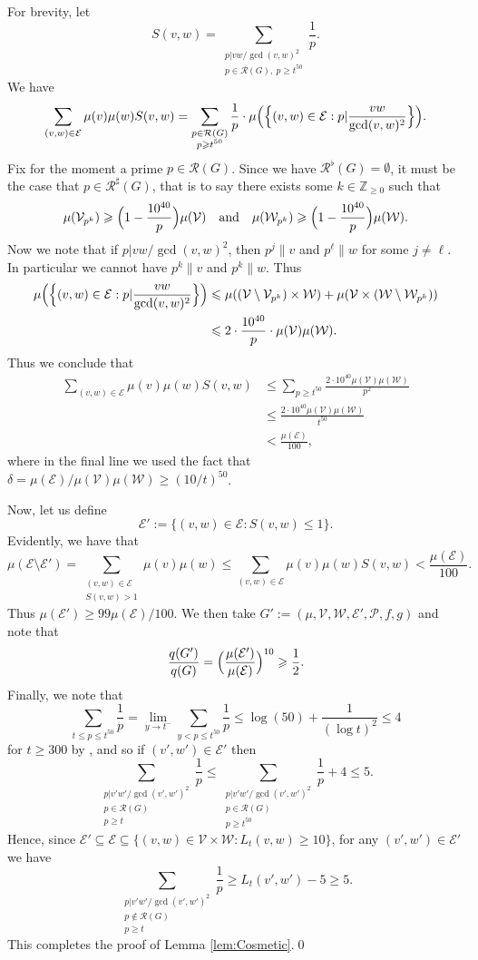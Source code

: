 \documentclass[12pt]{amsart}
\numberwithin{equation}{section}
\theoremstyle{definition}
\theoremstyle{remark}
\newcommand{\Z}{\mathbb{Z}}
\newcommand{\CE}{\mathcal{E}}
\newcommand{\CP}{\mathcal{P}}
\newcommand{\CR}{\mathcal{R}}
\newcommand{\CV}{\mathcal{V}}
\newcommand{\CW}{\mathcal{W}}
\newcommand{\als}[1]{\begin{align*} #1 \end{align*} }
\renewcommand{\le}{\leqslant}
\renewcommand{\ge}{\geqslant}
\begin{document}
For brevity, let
\[
S(v,w) = \sum_{\substack{p|v w/\gcd(v,w)^2\\p\in \CR(G),\ p\ge t^{50}}}\frac{1}{p}.
\]
We have
	\[
	\sum_{(v,w)\in\CE } \mu(v)\mu(w) S(v,w) 
	=   	\sum_{\substack{p\in \CR(G) \\ p\ge t^{50}}}\frac{1}{p}\cdot 
\mu\Bigl(\Bigl\{(v,w)\in\CE: p|\frac{v w}{\gcd(v,w)^2}\Bigr\}\Bigr) .
	\]
	Fix for the moment a prime $p\in\CR(G)$. Since we have $\CR^\flat(G)=\emptyset$, it must be the case that $p\in\CR^\sharp(G)$, that is to say there exists some $k\in\Z_{\ge0}$ such that 
	\[
	\mu(\CV_{p^k})\ge\Bigl(1-\frac{10^{40}}{p}\Bigr)\mu(\CV)
	\quad\text{and}\quad 
	\mu(\CW_{p^k})\ge\Bigl(1-\frac{10^{40}}{p}\Bigr)\mu(\CW).
	\]
	Now we note that if $p|v w/\gcd(v,w)^2$, then $p^j\|v$ and $p^\ell\|w$ for some $j\ne \ell$. In particular we cannot have $p^k \|v$ and $p^k\|w$.  Thus
	\als{
		\mu\Bigl(\Bigl\{(v,w)\in\CE: p|\frac{v w}{\gcd(v,w)^2}\Bigr\}\Bigr)&\le \mu((\CV\setminus\CV_{p^k})\times \CW)+\mu(\CV\times( \CW\setminus\CW_{p^k}))\\
		&	\le 2\cdot \frac{10^{40}}{p} \cdot \mu(\CV)\mu(\CW) .
	}
Thus we conclude that
	\als{
		\sum_{(v,w)\in\CE } \mu(v)\mu(w) S(v,w) 
		&\le  \sum_{p\ge t^{50}}\frac{2\cdot 10^{40} \mu(\CV)\mu(\CW) }{p^2}\\
		&\le \frac{2\cdot 10^{40}\mu(\CV)\mu(\CW) }{t^{50}}\\
		&<\frac{\mu(\CE) } {100}, 
}
where in the final line we used the fact that $\delta=\mu(\CE)/\mu(\CV)\mu(\CW)\ge (10/t)^{50}$. 

Now, let us define
\[
\CE':=\{(v,w)\in\CE:  S(v,w)\le 1\}.
\]
Evidently, we have that
\[
\mu(\CE\setminus\CE')=\sum_{\substack{(v,w)\in\CE \\ S(v,w)>1}}\mu(v)\mu(w)\le \sum_{(v,w)\in\CE } \mu(v)\mu(w) S(v,w) <\frac{\mu(\CE)}{100}.
\]
Thus $\mu(\CE')\ge 99\mu(\CE)/100$. We then take $G':=(\mu,\CV,\CW,\CE',\CP,f,g)$ and note that 
\[
\frac{q(G')}{q(G)}=\Bigl(\frac{\mu(\CE')}{\mu(\CE)}\Bigr)^{10}\ge \frac{1}{2} .
\]
Finally, we note that 
\[
\sum_{t\le p\le t^{50}}\frac{1}{p}= \lim_{y\to t^-}\sum_{y<p\le t^{50}}\frac{1}{p}\le \log(50)+\frac{1}{(\log t)^2}  \le 4
\]
for $t\ge 300$ by \cite[Theorem 5]{RS}, and so if $(v',w')\in\CE'$ then
\[
\sum_{\substack{p|v' w'/\gcd(v',w')^2\\p\in \CR(G)\\ p\ge t}}\frac{1}{p}\le  \sum_{\substack{p|v' w'/\gcd(v',w')^2\\p\in \CR(G)\\ p\ge t^{50}}}\frac{1}{p}+4\le 5.
\]
Hence, since $\CE'\subseteq\CE\subseteq \{(v,w)\in \CV\times\CW: L_t(v,w)\ge 10\}$, for any $(v',w')\in\CE'$ we have
\[
	\sum_{\substack{p|v' w'/\gcd(v',w')^2\\p\notin \CR(G)\\ p\ge t}}\frac{1}{p}\ge L_t(v',w')-5\ge 5.
\]
This completes the proof of Lemma \ref{lem:Cosmetic}.\qed
\end{document}
